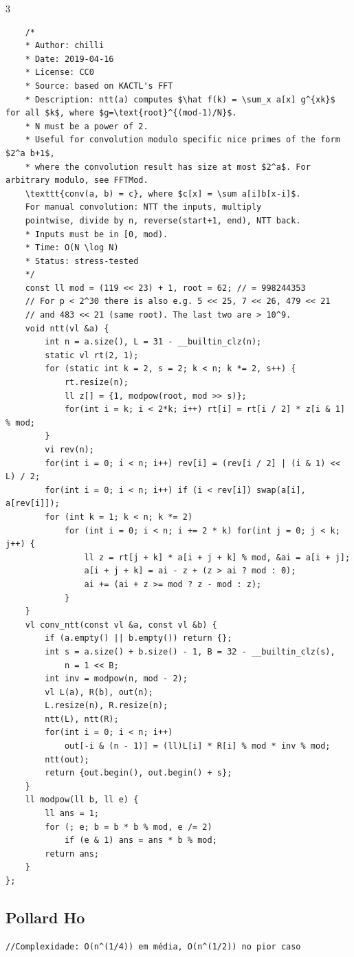 \documentclass[9pt, a4paper, notitlepage]{extreport}
\begin{document}
\begin{multicols}{3}
\begin{verbatim}
    /*
    * Author: chilli
    * Date: 2019-04-16
    * License: CC0
    * Source: based on KACTL's FFT
    * Description: ntt(a) computes $\hat f(k) = \sum_x a[x] g^{xk}$ for all $k$, where $g=\text{root}^{(mod-1)/N}$.
    * N must be a power of 2.
    * Useful for convolution modulo specific nice primes of the form $2^a b+1$,
    * where the convolution result has size at most $2^a$. For arbitrary modulo, see FFTMod.
    \texttt{conv(a, b) = c}, where $c[x] = \sum a[i]b[x-i]$.
    For manual convolution: NTT the inputs, multiply
    pointwise, divide by n, reverse(start+1, end), NTT back.
    * Inputs must be in [0, mod).
    * Time: O(N \log N)
    * Status: stress-tested
    */
    const ll mod = (119 << 23) + 1, root = 62; // = 998244353
    // For p < 2^30 there is also e.g. 5 << 25, 7 << 26, 479 << 21
    // and 483 << 21 (same root). The last two are > 10^9.
    void ntt(vl &a) {
        int n = a.size(), L = 31 - __builtin_clz(n);
        static vl rt(2, 1);
        for (static int k = 2, s = 2; k < n; k *= 2, s++) {
            rt.resize(n);
            ll z[] = {1, modpow(root, mod >> s)};
            for(int i = k; i < 2*k; i++) rt[i] = rt[i / 2] * z[i & 1] % mod;
        }
        vi rev(n);
        for(int i = 0; i < n; i++) rev[i] = (rev[i / 2] | (i & 1) << L) / 2;
        for(int i = 0; i < n; i++) if (i < rev[i]) swap(a[i], a[rev[i]]);
        for (int k = 1; k < n; k *= 2)
            for (int i = 0; i < n; i += 2 * k) for(int j = 0; j < k; j++) {
                ll z = rt[j + k] * a[i + j + k] % mod, &ai = a[i + j];
                a[i + j + k] = ai - z + (z > ai ? mod : 0);
                ai += (ai + z >= mod ? z - mod : z);
            }
    }
    vl conv_ntt(const vl &a, const vl &b) {
        if (a.empty() || b.empty()) return {};
        int s = a.size() + b.size() - 1, B = 32 - __builtin_clz(s),
            n = 1 << B;
        int inv = modpow(n, mod - 2);
        vl L(a), R(b), out(n);
        L.resize(n), R.resize(n);
        ntt(L), ntt(R);
        for(int i = 0; i < n; i++)
            out[-i & (n - 1)] = (ll)L[i] * R[i] % mod * inv % mod;
        ntt(out);
        return {out.begin(), out.begin() + s};
    }
    ll modpow(ll b, ll e) {
        ll ans = 1;
        for (; e; b = b * b % mod, e /= 2)
            if (e & 1) ans = ans * b % mod;
        return ans;
    }
};
\end{verbatim}

\subsection{Pollard Ho}
\begin{verbatim}
//Complexidade: O(n^(1/4)) em média, O(n^(1/2)) no pior caso


\end{verbatim}
\end{multicols}
\end{document}
